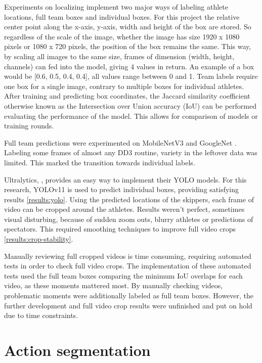 Experiments on localizing implement two major ways of labeling athlete locations, full team boxes and individual boxes.
For this project the relative center point along the x-axis, y-axis, width and height of the box are stored. So regardless of the scale of the image, whether the image has size 1920 x 1080 pixels or 1080 x 720 pixels, the position of the box remains the same.
This way, by scaling all images to the same size, frames of dimension (width, height, channels) can fed into the model, giving 4 values in return. An example of a box would be [0.6, 0.5, 0.4, 0.4], all values range between 0 and 1.
Team labels require one box for a single image, contrary to multiple boxes for individual athletes. 
After training and predicting box coordinates, the Jaccard similarity coefficient otherwise known as the Intersection over Union accuracy (IoU) can be performed evaluating the performance of the model. This allows for comparison of models or training rounds.

Full team predictions were experimented on MobileNetV3 \autocite{Howard2019} and GoogleNet \autocite{Szegedy2014}. Labeling some frames of almost any DD3 routine, variety in the leftover data was limited. This marked the transition towards individual labels.

Ultralytics, \autocite{Khanam2024}, provides an easy way to implement their YOLO models. For this research, YOLOv11 is used to predict individual boxes, providing satisfying results \ref{results:yolo}. 
Using the predicted locations of the skippers, each frame of video can be cropped around the athletes. Results weren't perfect, sometimes visual disturbing, because of sudden zoom outs, blurry athletes or predictions of spectators. This required smoothing techniques to improve full video crops \ref{results:crop-stability}.

Manually reviewing full cropped videos is time consuming, requiring automated tests in order to check full video crops. The implementation of these automated tests used the full team boxes comparing the minimum IoU overlaps for each video, as these moments mattered most. By manually checking videos, problematic moments were additionally labeled as full team boxes. However, the further development and full video crop results were unfinished and put on hold due to time constraints. 

\section{Action segmentation}
\label{methodology:action-segmentation}

